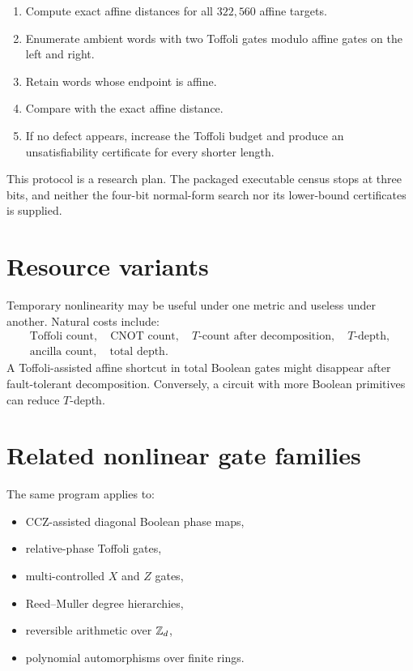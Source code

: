 \begin{protocol}
\begin{enumerate}
\item Compute exact affine distances for all $322{,}560$ affine targets.
\item Enumerate ambient words with two Toffoli gates modulo affine gates on the left and right.
\item Retain words whose endpoint is affine.
\item Compare with the exact affine distance.
\item If no defect appears, increase the Toffoli budget and produce an unsatisfiability certificate for every shorter length.
\end{enumerate}
\end{protocol}
This protocol is a research plan.  The packaged executable census stops at three bits, and neither the four-bit normal-form search nor its lower-bound certificates is supplied.

\section{Resource variants}
Temporary nonlinearity may be useful under one metric and useless under another.  Natural costs include:
\[
\begin{gathered}
\text{Toffoli count},\quad \text{CNOT count},\quad
T\text{-count after decomposition},\quad T\text{-depth},\\
\text{ancilla count},\quad \text{total depth}.
\end{gathered}
\]
A Toffoli-assisted affine shortcut in total Boolean gates might disappear after fault-tolerant decomposition.  Conversely, a circuit with more Boolean primitives can reduce $T$-depth.

\section{Related nonlinear gate families}
The same program applies to:
\begin{itemize}
\item CCZ-assisted diagonal Boolean phase maps,
\item relative-phase Toffoli gates,
\item multi-controlled $X$ and $Z$ gates,
\item Reed--Muller degree hierarchies,
\item reversible arithmetic over $\mathbb Z_d$,
\item polynomial automorphisms over finite rings.
\end{itemize}


